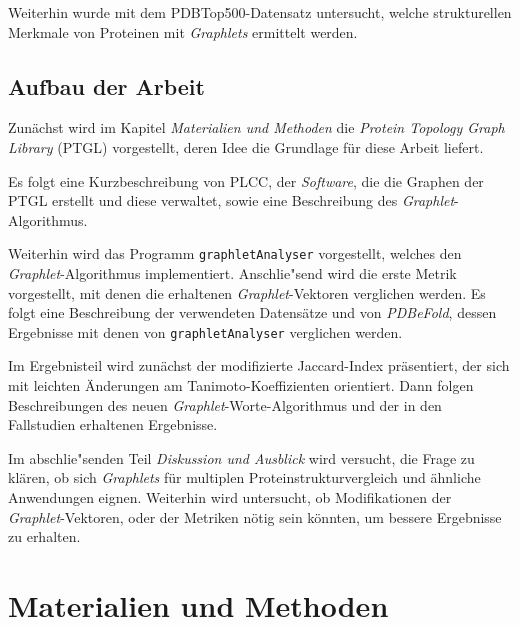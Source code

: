 \documentclass{report}
\begin{document}
Weiterhin wurde mit dem PDBTop500-Datensatz \cite{top500} untersucht, welche strukturellen Merkmale von Proteinen mit \textit{Graphlets} ermittelt werden.

\section{Aufbau der Arbeit}

Zun\"achst wird im Kapitel \emph{Materialien und Methoden} die \textit{Protein Topology Graph Library} (PTGL) \cite{ptgl1} vorgestellt, deren Idee die Grundlage f\"ur diese Arbeit liefert. 
 
Es folgt eine Kurzbeschreibung von PLCC, der \textit{Software}, die die Graphen der PTGL erstellt und diese verwaltet, sowie eine Beschreibung des \textit{Graphlet}-Algorithmus.

Weiterhin wird das Programm \texttt{graphletAnalyser} vorgestellt, welches den \textit{Graphlet}-Algorithmus implementiert.
Anschlie"send wird die erste Metrik vorgestellt, mit denen die erhaltenen \textit{Graphlet}-Vektoren verglichen werden. Es folgt eine Beschreibung der verwendeten Datens\"atze und von \textit{PDBeFold}, dessen Ergebnisse mit denen von \texttt{graphletAnalyser} verglichen werden.

Im Ergebnisteil wird zun\"achst der modifizierte Jaccard-Index pr\"asentiert, der sich mit leichten \"Anderungen am Tanimoto-Koeffizienten orientiert. Dann folgen Beschreibungen des neuen \textit{Graphlet}-Worte-Algorithmus und der in den Fallstudien erhaltenen Ergebnisse.

Im abschlie"senden Teil \emph{Diskussion und Ausblick} wird versucht, die Frage zu kl\"aren, ob sich \textit{Graphlets} f\"ur multiplen Proteinstrukturvergleich und \"ahnliche Anwendungen eignen. Weiterhin wird untersucht, ob Modifikationen der \textit{Graphlet}-Vektoren, oder der Metriken n\"otig sein k\"onnten, um bessere Ergebnisse zu erhalten. 



\chapter{Materialien und Methoden}



\end{document}
